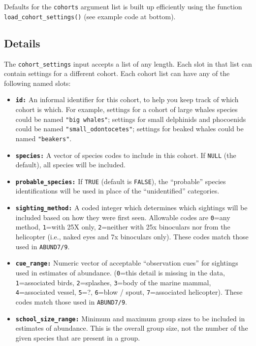 \documentclass[
]{book}
\begin{document}
Defaults for the \texttt{cohorts} argument list is built up efficiently using the function \texttt{load\_cohort\_settings()} (see example code at bottom).

\hypertarget{details-1}{%
\subsection*{Details}\label{details-1}}

The \texttt{cohort\_settings} input accepts a list of any length. Each slot in that list can contain settings for a different cohort. Each cohort list can have any of the following named slots:

\begin{itemize}
\item
  \textbf{\texttt{id:}} An informal identifier for this cohort, to help you keep track of which cohort is which. For example, settings for a cohort of large whales species could be named \texttt{"big\ whales"}; settings for small delphinids and phocoenids could be named \texttt{"small\_odontocetes"}; settings for beaked whales could be named \texttt{"beakers"}.
\item
  \textbf{\texttt{species:}} A vector of species codes to include in this cohort. If \texttt{NULL} (the default), all species will be included.
\item
  \textbf{\texttt{probable\_species:}} If \texttt{TRUE} (default is \texttt{FALSE}), the ``probable'' species identifications will be used in place of the ``unidentified'' categories.
\item
  \textbf{\texttt{sighting\_method:}} A coded integer which determines which sightings will be included based on how they were first seen. Allowable codes are \texttt{0}=any method, \texttt{1}=with 25X only, \texttt{2}=neither with 25x binoculars nor from the helicopter (i.e., naked eyes and 7x binoculars only). These codes match those used in \texttt{ABUND7/9}.
\item
  \textbf{\texttt{cue\_range:}} Numeric vector of acceptable ``observation cues'' for sightings used in estimates of abundance. (\texttt{0}=this detail is missing in the data, \texttt{1}=associated birds, \texttt{2}=splashes, \texttt{3}=body of the marine mammal, \texttt{4}=associated vessel, \texttt{5}=?, \texttt{6}=blow / spout, \texttt{7}=associated helicopter). These codes match those used in \texttt{ABUND7/9}.
\item
  \textbf{\texttt{school\_size\_range:}} Minimum and maximum group sizes to be included in estimates of abundance. This is the overall group size, not the number of the given species that are present in a group.

\end{itemize}
\end{document}
